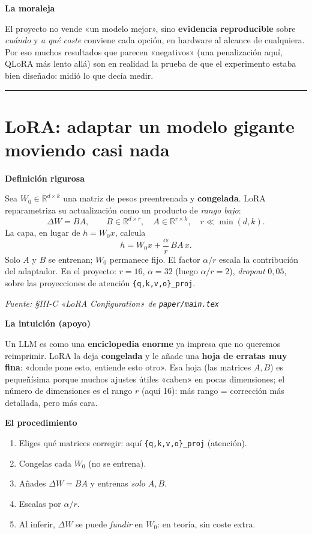 \documentclass[11pt,a4paper]{article}
\newcommand{\nivel}[1]{\medskip\noindent\textbf{\textcolor{blue!45!black}{#1}}\par\nopagebreak\smallskip}
\newcommand{\fuente}[1]{\nopagebreak\par\hfill{\footnotesize\textit{Fuente: #1}}\par}
\begin{document}
\nivel{La moraleja}
El proyecto no vende «un modelo mejor», sino \textbf{evidencia reproducible} sobre \emph{cuándo} y
\emph{a qué coste} conviene cada opción, en hardware al alcance de cualquiera. Por eso muchos
resultados que parecen «negativos» (una penalización aquí, QLoRA más lento allá) son en realidad la
prueba de que el experimento estaba bien diseñado: midió lo que decía medir.

\bigskip\hrule\bigskip

\section{LoRA: adaptar un modelo gigante moviendo casi nada}\label{sec:lora}

\nivel{Definición rigurosa}
Sea $W_0 \in \mathbb{R}^{d \times k}$ una matriz de pesos preentrenada y \textbf{congelada}. LoRA
reparametriza su actualización como un producto de \emph{rango bajo}:
\[
\Delta W = B A, \qquad B \in \mathbb{R}^{d \times r}, \quad A \in \mathbb{R}^{r \times k}, \quad r \ll \min(d,k).
\]
La capa, en lugar de $h = W_0 x$, calcula
\[
h = W_0 x + \frac{\alpha}{r}\, B A\, x .
\]
Solo $A$ y $B$ se entrenan; $W_0$ permanece fijo. El factor $\alpha/r$ escala la contribución del
adaptador. En el proyecto: $r=16$, $\alpha=32$ (luego $\alpha/r=2$), \emph{dropout} $0{,}05$, sobre
las proyecciones de atención \texttt{\{q,k,v,o\}\_proj}.
\fuente{\S III-C «LoRA Configuration» de \texttt{paper/main.tex}}

\nivel{La intuición (apoyo)}
Un LLM es como una \textbf{enciclopedia enorme} ya impresa que no queremos reimprimir. LoRA la deja
\textbf{congelada} y le añade una \textbf{hoja de erratas muy fina}: «donde pone esto, entiende esto
otro». Esa hoja (las matrices $A,B$) es pequeñísima porque muchos ajustes útiles «caben» en pocas
dimensiones; el número de dimensiones es el rango $r$ (aquí 16): más rango = corrección más
detallada, pero más cara.

\nivel{El procedimiento}
\begin{enumerate}[nosep]
  \item Eliges qué matrices corregir: aquí \texttt{\{q,k,v,o\}\_proj} (atención).
  \item Congelas cada $W_0$ (no se entrena).
  \item Añades $\Delta W = BA$ y entrenas \emph{solo} $A,B$.
  \item Escalas por $\alpha/r$.
  \item Al inferir, $\Delta W$ se puede \emph{fundir} en $W_0$: en teoría, sin coste extra.
\end{enumerate}
\end{document}
